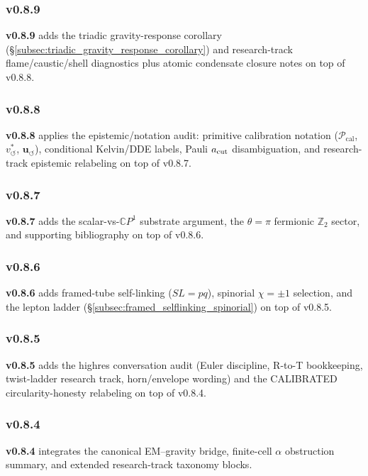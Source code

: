\documentclass[11pt]{article}
\theoremstyle{definition}
\theoremstyle{plain}
\theoremstyle{remark}
\newcommand{\vchar}{v_{\!\boldsymbol{\circlearrowleft}}^{\ast}}
\newcommand{\uswirl}{\mathbf{u}_{\!\boldsymbol{\circlearrowleft}}}
\begin{document}
        \subsubsection{v0.8.9}
            \textbf{v0.8.9} adds the triadic gravity-response corollary (\S\ref{subsec:triadic_gravity_response_corollary}) and research-track flame/caustic/shell diagnostics plus atomic condensate closure notes on top of v0.8.8.

        \subsubsection{v0.8.8}
            \textbf{v0.8.8} applies the epistemic/notation audit: primitive calibration notation ($\mathcal{P}_{\mathrm{cal}}$, $\vchar$, $\uswirl$), conditional Kelvin/DDE labels, Pauli $a_{\rm cut}$ disambiguation, and research-track epistemic relabeling on top of v0.8.7.

        \subsubsection{v0.8.7}
            \textbf{v0.8.7} adds the scalar-vs-$\mathbb{C}P^1$ substrate argument, the $\theta=\pi$ fermionic $\mathbb{Z}_2$ sector, and supporting bibliography on top of v0.8.6.

        \subsubsection{v0.8.6}
            \textbf{v0.8.6} adds framed-tube self-linking ($SL=pq$), spinorial $\chi=\pm1$ selection, and the lepton ladder (\S\ref{subsec:framed_selflinking_spinorial}) on top of v0.8.5.

        \subsubsection{v0.8.5}
            \textbf{v0.8.5} adds the highres conversation audit (Euler discipline, R-to-T bookkeeping, twist-ladder research track, horn/envelope wording) and the CALIBRATED circularity-honesty relabeling on top of v0.8.4.

        \subsubsection{v0.8.4}
            \textbf{v0.8.4} integrates the canonical EM--gravity bridge, finite-cell $\alpha$ obstruction summary, and extended research-track taxonomy blocks.
\end{document}
